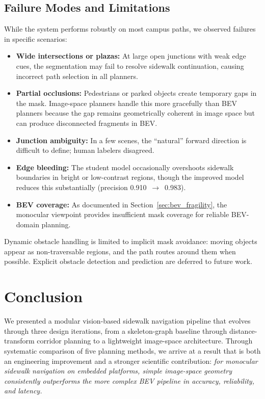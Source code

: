 \documentclass[a4paper,fleqn,10pt]{cas-dc}
\begin{document}
\subsection{Failure Modes and Limitations}
\label{sec:failure_modes}

While the system performs robustly on most campus paths, we observed failures in specific scenarios:

\begin{itemize}[noitemsep,topsep=2pt]
    \item \textbf{Wide intersections or plazas:} At large open junctions with weak edge cues, the segmentation may fail to resolve sidewalk continuation, causing incorrect path selection in all planners.
    \item \textbf{Partial occlusions:} Pedestrians or parked objects create temporary gaps in the mask. Image-space planners handle this more gracefully than BEV planners because the gap remains geometrically coherent in image space but can produce disconnected fragments in BEV.
    \item \textbf{Junction ambiguity:} In a few scenes, the ``natural'' forward direction is difficult to define; human labelers disagreed.
    \item \textbf{Edge bleeding:} The student model occasionally overshoots sidewalk boundaries in bright or low-contrast regions, though the improved model reduces this substantially (precision 0.910~$\to$~0.983).
    \item \textbf{BEV coverage:} As documented in Section~\ref{sec:bev_fragility}, the monocular viewpoint provides insufficient mask coverage for reliable BEV-domain planning.
\end{itemize}

Dynamic obstacle handling is limited to implicit mask avoidance: moving objects appear as non-traversable regions, and the path routes around them when possible. Explicit obstacle detection and prediction are deferred to future work.


\section{Conclusion}
\label{sec:conclusion}

We presented a modular vision-based sidewalk navigation pipeline that evolves through three design iterations, from a skeleton-graph baseline through distance-transform corridor planning to a lightweight image-space architecture. Through systematic comparison of five planning methods, we arrive at a result that is both an engineering improvement and a stronger scientific contribution: \emph{for monocular sidewalk navigation on embedded platforms, simple image-space geometry consistently outperforms the more complex BEV pipeline in accuracy, reliability, and latency.}
\end{document}
